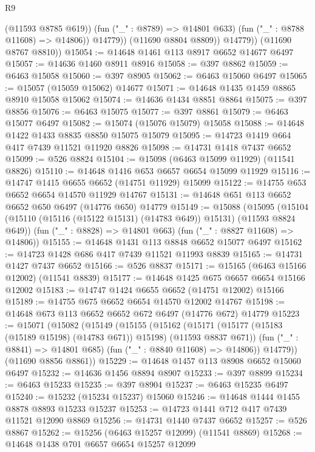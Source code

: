 \begin{lexlean}{R9}
\begin{coremodule}
{{{{{{{{{{{{{{{{{{{{{{{{{{{{{{{{{{{{{{{{{{{{{{{{{{{{{{{{{{{{{{{{{{{{{{{{{{{{{{{{{{{{                    (@11593 @8785 @619))
                  (fun ("_" : @8789) => @14801 @633)
                  (fun ("_" : @8788 @11608) => @14806))
                @14779))
            (@11690 @8804 @8809))
          @14779))
      (@11690 @8767 @8810))
@15054 := @14648 @1461 @113 @8917 @6652 @14677 @6497
@15057 := @14636 @1460 @8911 @8916
@15058 := @397 @8862
@15059 := @6463 @15058
@15060 := @397 @8905
@15062 := @6463 @15060 @6497
@15065 := @15057 (@15059 @15062) @14677
@15071 := @14648 @1435 @1459 @8865 @8910 @15058 @15062
@15074 := @14636 @1434 @8851 @8864
@15075 := @397 @8856
@15076 := @6463 @15075
@15077 := @397 @8861
@15079 := @6463 @15077 @6497
@15082 := @15074 (@15076 @15079) @15058
@15088 := @14648 @1422 @1433 @8835 @8850 @15075 @15079
@15095 := @14723 @1419 @664 @417 @7439 @11521 @11920 @8826
@15098 := @14731 @1418 @7437 @6652
@15099 := @526 @8824
@15104 := @15098 (@6463 @15099 @11929) (@11541 @8826)
@15110 := @14648 @1416 @653 @6657 @6654 @15099 @11929
@15116 := @14747 @1415 @6655 @6652 (@14751 @11929) @15099
@15122 := @14755 @653 @6652 @6654 @14570 @11929 @14767
@15131 := @14648 @651 @113 @6652 @6652 @650 @6497 (@14776 @650) @14779
@15149 := @15088
    (@15095
      (@15104 (@15110 (@15116 (@15122 @15131) (@14783 @649)) @15131) (@11593 @8824 @649))
      (fun ("_" : @8828) => @14801 @663)
      (fun ("_" : @8827 @11608) => @14806))
@15155 := @14648 @1431 @113 @8848 @6652 @15077 @6497
@15162 := @14723 @1428 @686 @417 @7439 @11521 @11993 @8839
@15165 := @14731 @1427 @7437 @6652
@15166 := @526 @8837
@15171 := @15165 (@6463 @15166 @12002) (@11541 @8839)
@15177 := @14648 @1425 @675 @6657 @6654 @15166 @12002
@15183 := @14747 @1424 @6655 @6652 (@14751 @12002) @15166
@15189 := @14755 @675 @6652 @6654 @14570 @12002 @14767
@15198 := @14648 @673 @113 @6652 @6652 @672 @6497 (@14776 @672) @14779
@15223 := @15071
    (@15082
      (@15149
        (@15155
          (@15162
            (@15171 (@15177 (@15183 (@15189 @15198) (@14783 @671)) @15198) (@11593 @8837 @671))
            (fun ("_" : @8841) => @14801 @685)
            (fun ("_" : @8840 @11608) => @14806))
          @14779))
      (@11690 @8856 @8861))
@15229 := @14648 @1457 @113 @8908 @6652 @15060 @6497
@15232 := @14636 @1456 @8894 @8907
@15233 := @397 @8899
@15234 := @6463 @15233
@15235 := @397 @8904
@15237 := @6463 @15235 @6497
@15240 := @15232 (@15234 @15237) @15060
@15246 := @14648 @1444 @1455 @8878 @8893 @15233 @15237
@15253 := @14723 @1441 @712 @417 @7439 @11521 @12090 @8869
@15256 := @14731 @1440 @7437 @6652
@15257 := @526 @8867
@15262 := @15256 (@6463 @15257 @12099) (@11541 @8869)
@15268 := @14648 @1438 @701 @6657 @6654 @15257 @12099
}}}}}}}}}}}}}}}}}}}}}}}}}}}}}}}}}}}}}}}}}}}}}}}}}}}}}}}}}}}}}}}}}}}}}}}}}}}}}}}}}}}}
\end{coremodule}
\end{lexlean}
